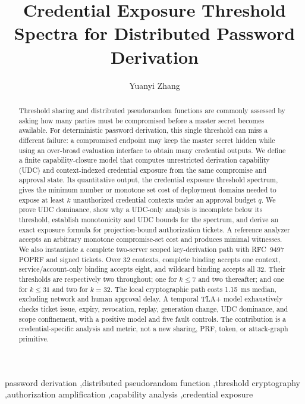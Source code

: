 \documentclass[preprint,12pt]{elsarticle}
\begin{document}
\begin{frontmatter}

\title{Credential Exposure Threshold Spectra for Distributed Password Derivation}

\author{Yuanyi Zhang}
\address{Independent Researcher}

\begin{abstract}
Threshold sharing and distributed pseudorandom functions are commonly assessed
by asking how many parties must be compromised before a master secret becomes
available.  For deterministic password derivation, this single threshold can
miss a different failure: a compromised endpoint may keep the master secret
hidden while using an over-broad evaluation interface to obtain many
credential outputs.  We define a finite capability-closure model that computes
unrestricted derivation capability (UDC) and context-indexed credential
exposure from the same
compromise and approval state.  Its quantitative output, the credential
exposure threshold spectrum, gives the minimum number or monotone set cost of
deployment domains needed to expose at least $k$ unauthorized credential
contexts under an approval budget $q$.  We prove UDC dominance, show why a
UDC-only analysis is incomplete below its threshold, establish monotonicity
and UDC bounds for the spectrum, and derive an exact exposure formula for
projection-bound authorization tickets.  A reference analyzer accepts an
arbitrary monotone compromise-set cost and produces minimal witnesses.  We
also instantiate a complete two-server scoped key-derivation path with
RFC~9497 POPRF and signed tickets.  Over 32 contexts, complete binding accepts
one context, service/account-only binding accepts eight, and wildcard binding
accepts all 32.  Their thresholds are respectively two throughout; one for
$k\le7$ and two thereafter; and one for $k\le31$ and two for $k=32$.  The local cryptographic path
costs 1.15~ms median, excluding network and human approval delay.
A temporal TLA+ model exhaustively checks ticket issue, expiry, revocation,
replay, generation change, UDC dominance, and scope confinement, with a
positive model and five fault controls.  The contribution is a
credential-specific analysis and metric, not a new sharing, PRF, token, or
attack-graph primitive.
\end{abstract}

\begin{keyword}
password derivation \sep distributed pseudorandom function \sep threshold
cryptography \sep authorization amplification \sep capability analysis
\sep credential exposure
\end{keyword}

\end{frontmatter}
\end{document}
